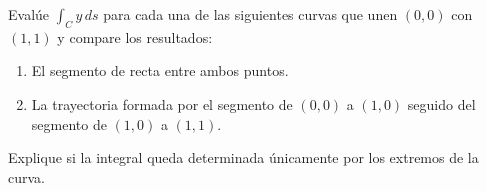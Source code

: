 Evalúe $\int_C y\,ds$ para cada una de las siguientes curvas que unen $(0,0)$ con $(1,1)$ y compare los resultados:
\begin{enumerate}
    \item El segmento de recta entre ambos puntos.
    \item La trayectoria formada por el segmento de $(0,0)$ a $(1,0)$ seguido del segmento de $(1,0)$ a $(1,1)$.
\end{enumerate}
Explique si la integral queda determinada únicamente por los extremos de la curva.

